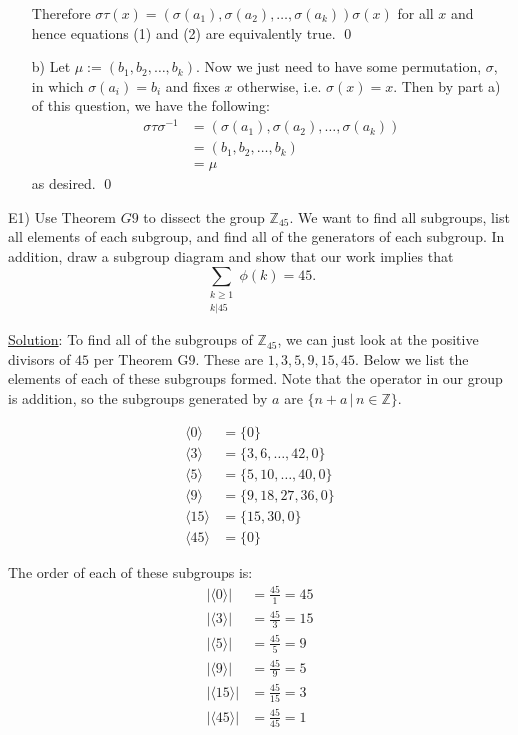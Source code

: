 \documentclass{article}
\begin{document}
\begin{enumerate}
Therefore $\sigma\tau (x) = (\sigma(a_1), \sigma(a_2), \ldots, \sigma(a_k)) \sigma (x)$ for all $x$ and hence equations (1) and (2) are equivalently true. \qed 
	\item[b)] Let $\mu := (b_1, b_2, \ldots, b_k)$. Now we just need to have some permutation, $\sigma$, in which  $\sigma(a_i) = b_i$ and fixes $x$ otherwise, i.e. $\sigma(x) = x$. Then by part a) of this question, we have the following:
\begin{align*}
	\sigma\tau\sigma^{-1} &= (\sigma(a_1), \sigma(a_2), \ldots, \sigma(a_k)) \\
	 &=(b_1, b_2, \ldots, b_k) \\
	 &= \mu
\end{align*}
as desired. \qed \\
\end{enumerate}

E1) Use Theorem $G9$ to dissect the group $\mathbb{Z}_{45}.$ We want to find all subgroups, list all elements of each subgroup, and find all of the generators of each subgroup. In addition, draw a subgroup diagram and show that our work implies that 
$$\sum\limits_{\substack{k \geq 1 \\ k \rvert 45}} \phi(k) = 45.$$

\underline{Solution}: To find all of the subgroups of $\mathbb{Z}_{45}$, we can just look at the positive divisors of $45$ per Theorem G9. These are $1, 3, 5, 9, 15, 45.$ Below we list the elements of each of these subgroups formed. Note that the operator in our group is addition, so the subgroups generated by $a$ are $\{n+a \, \vert \, n \in \mathbb{Z} \}.$

\begin{align*}
	\langle 0 \rangle &= \{ 0 \} \\
	\langle 3 \rangle &= \{ 3, 6, \ldots, 42, 0 \} \\
	\langle 5 \rangle &= \{ 5, 10, \ldots, 40, 0 \} \\
	\langle 9 \rangle &= \{ 9, 18, 27, 36, 0 \} \\
	\langle 15 \rangle &= \{ 15, 30, 0 \} \\
	\langle 45 \rangle &= \{ 0 \} 
\end{align*}

The order of each of these subgroups is:
\begin{align*}
	\lvert \langle 0 \rangle \vert &= \frac{45}{1} = 45 \\
	\lvert \langle 3 \rangle \vert &= \frac{45}{3} = 15 \\
	\lvert \langle 5 \rangle \vert &= \frac{45}{5} = 9 \\
	\lvert \langle 9 \rangle \vert &= \frac{45}{9} = 5 \\
	\lvert \langle 15 \rangle \vert &= \frac{45}{15} = 3 \\
	\lvert \langle 45 \rangle \vert &= \frac{45}{45} = 1
\end{align*}
\end{document}
